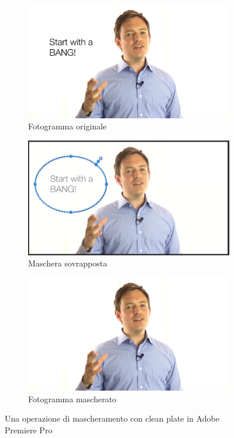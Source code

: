 \begin{figure}[ht]
    \centering
    \begin{subfigure}{0.32\textwidth}
        \includegraphics[width=0.95\linewidth]{images/original_frame} 
        \caption{Fotogramma originale}
        \label{fig:original_frame}
    \end{subfigure}
    \hfill
    \begin{subfigure}{0.32\textwidth}
        \includegraphics[width=0.95\linewidth]{images/mask_with_text}
        \caption{Maschera sovrapposta}
        \label{fig:mask_with_text}
    \end{subfigure}
    \hfill
    \begin{subfigure}{0.32\textwidth}
        \includegraphics[width=0.95\linewidth]{images/masked}
        \caption{Fotogramma mascherato}
        \label{fig:masked}
    \end{subfigure}
    
    \caption{Una operazione di mascheramento con clean plate in Adobe Premiere Pro}
    \label{fig:masking}
\end{figure}

